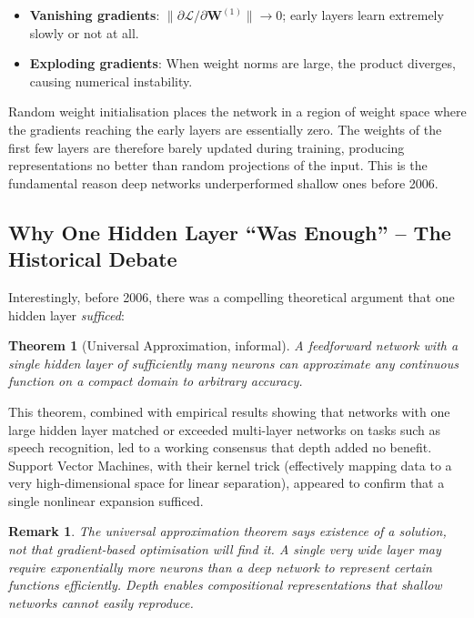 \documentclass[12pt,a4paper]{article}
\newtheorem{theorem}{Theorem}[section]
\newtheorem{remark}{Remark}[section]
\newcommand{\loss}{\mathcal{L}}
\newcommand{\W}{\mathbf{W}}
\begin{document}
\begin{itemize}[leftmargin=*]
  \item \textbf{Vanishing gradients}: $\|\partial \loss / \partial \W^{(1)}\|
        \to 0$; early layers learn extremely slowly or not at all.
  \item \textbf{Exploding gradients}: When weight norms are large,
        the product diverges, causing numerical instability.
\end{itemize}

\begin{warningbox}
  Random weight initialisation places the network in a region of weight space
  where the gradients reaching the early layers are essentially zero.  The
  weights of the first few layers are therefore barely updated during training,
  producing representations no better than random projections of the input.
  This is the fundamental reason deep networks underperformed shallow ones
  before 2006.
\end{warningbox}

\subsection{Why One Hidden Layer ``Was Enough'' -- The Historical Debate}

Interestingly, before 2006, there was a compelling theoretical argument that
one hidden layer \emph{sufficed}:

\begin{theorem}[Universal Approximation, informal]
\label{thm:ua}
  A feedforward network with a single hidden layer of sufficiently many
  neurons can approximate any continuous function on a compact domain to
  arbitrary accuracy.
\end{theorem}

This theorem, combined with empirical results showing that networks with one
large hidden layer matched or exceeded multi-layer networks on tasks such as
speech recognition, led to a working consensus that depth added no benefit.
Support Vector Machines, with their kernel trick (effectively mapping data to
a very high-dimensional space for linear separation), appeared to confirm that
a single nonlinear expansion sufficed.

\begin{remark}
  The universal approximation theorem says \emph{existence} of a solution, not
  that gradient-based optimisation will \emph{find} it.  A single very wide
  layer may require exponentially more neurons than a deep network to represent
  certain functions efficiently.  Depth enables compositional representations
  that shallow networks cannot easily reproduce.
\end{remark}
\end{document}
